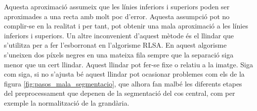 Aquesta aproximació assumeix que les línies inferiors i superiors poden ser aproximades a una recta amb molt poc d'error. Aquesta assumpció pot no complir-se en la realitat i per tant, pot obtenir una mala aproximació a les línies inferiors i superiors. Un altre inconvenient d'aquest mètode és el llindar que s'utilitza per a fer l'esborronat en l'algorisme RLSA. En aquest algorisme s'uneixen dos píxels negres en una mateixa fila sempre que la separació siga menor que un cert llindar. Aquest llindar pot fer-se fixe o relatiu a la imatge. Siga com siga, si no s'ajusta bé aquest llindar pot ocasionar problemes com els de la figura \ref{fig:pasos_mala_segmentacio}, que alhora fan malbé les diferents etapes del preprocessament que depenen de la segmentació del cos central, com per exemple la normalització de la grandària.


